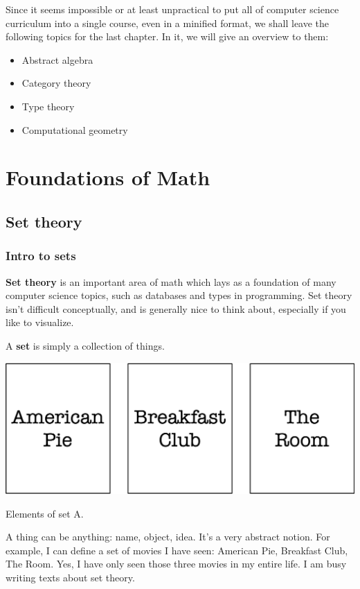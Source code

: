 \documentclass[a4paper, justified, notitlepage, sfsidenotes, notoc]{tufte-book}
\begin{document}
Since it seems impossible or at least unpractical to put all of computer science curriculum into a single course, even in a minified format, we shall leave the following topics for the last chapter. In it, we will give an overview to them:

\begin{itemize}
\item Abstract algebra
\item Category theory
\item Type theory
\item Computational geometry
\end{itemize}

\part{Foundations of Math}
\label{sec:org0627daf}
\chapter{Set theory}
\label{sec:orgb876989}

\section{Intro to sets}
\label{sec:org99a5758}

\textbf{\textbf{Set theory}} is an important area of math which lays as a foundation of many computer science topics, such as databases and types in programming. Set theory isn't difficult conceptually, and is generally nice to think about, especially if you like to visualize.

A \textbf{\textbf{set}} is simply a collection of things.

\begin{marginfigure}
  \includegraphics[width=\linewidth]{images/set_movies.png}
  \caption{Elements of set A.}
  \label{fig:marginfig}
\end{marginfigure}

A thing can be anything: name, object, idea. It's a very abstract notion. For example, I can define a set of movies I have seen: American Pie, Breakfast Club, The Room. Yes, I have only seen those three movies in my entire life. I am busy writing texts about set theory.
\end{document}
